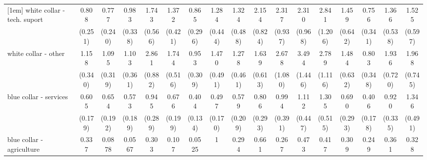 {\begin{tabular}{l*{16}{c}}
[1em]
white collar - tech. suport&       0.808         &       0.777         &       0.983         &       1.743         &       1.372         &       0.865         &       1.284         &       1.324         &       2.154\sym{*}  &       2.317\sym{*}  &       2.310\sym{*}  &       2.841\sym{*}  &       1.459         &       0.756         &       1.366         &       1.525         \\
                    &     (0.251)         &     (0.240)         &     (0.338)         &     (0.566)         &     (0.421)         &     (0.296)         &     (0.444)         &     (0.488)         &     (0.824)         &     (0.937)         &     (0.968)         &     (1.206)         &     (0.642)         &     (0.341)         &     (0.538)         &     (0.597)         \\
[1em]
white collar - other&       1.158         &       1.095         &       1.103         &       2.861\sym{***}&       1.744         &       0.953         &       1.470         &       1.278         &       1.639         &       2.678\sym{*}  &       3.494\sym{**} &       2.789\sym{*}  &       1.484         &       0.803         &       1.936         &       1.968         \\
                    &     (0.340)         &     (0.319)         &     (0.361)         &     (0.882)         &     (0.516)         &     (0.309)         &     (0.491)         &     (0.461)         &     (0.613)         &     (1.080)         &     (1.446)         &     (1.116)         &     (0.632)         &     (0.348)         &     (0.720)         &     (0.745)         \\
[1em]
blue collar - services&       0.605         &       0.654         &       0.573         &       0.945         &       0.676         &       0.404\sym{**} &       0.497\sym{*}  &       0.579         &       0.806         &       0.994         &       1.112         &       1.305         &       0.690         &       0.406\sym{*}  &       0.920         &       1.346         \\
                    &     (0.179)         &     (0.192)         &     (0.189)         &     (0.289)         &     (0.199)         &     (0.134)         &     (0.170)         &     (0.209)         &     (0.293)         &     (0.391)         &     (0.447)         &     (0.515)         &     (0.293)         &     (0.178)         &     (0.335)         &     (0.491)         \\
[1em]
blue collar - agriculture&       0.337         &      0.0878\sym{**} &      0.0567\sym{*}  &       0.303         &       0.107\sym{*}  &      0.0525\sym{**} &           1         &       0.294         &       0.661         &       0.267         &       0.473         &       0.417         &       0.309         &       0.249         &       0.361         &       0.328         \\

\end{tabular}}
